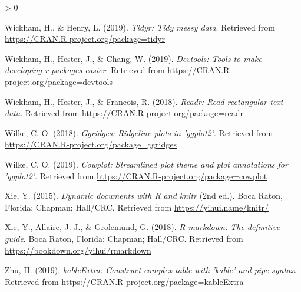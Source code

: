 \documentclass[
  english,
  doc,floatsintext]{apa6}
\newlength{\cslhangindent}
\newenvironment{CSLReferences}[2] %
 {%
  \setlength{\parindent}{0pt}
  \ifodd #1 \everypar{\setlength{\hangindent}{\cslhangindent}}\ignorespaces\fi
  \ifnum #2 > 0
  \setlength{\parskip}{#2\baselineskip}
  \fi
 }%
 {}
\begin{document}
\begin{CSLReferences}{1}{0}
\leavevmode\hypertarget{ref-R-tidyr}{}%
Wickham, H., \& Henry, L. (2019). \emph{Tidyr: Tidy messy data}. Retrieved from \url{https://CRAN.R-project.org/package=tidyr}

\leavevmode\hypertarget{ref-R-devtools}{}%
Wickham, H., Hester, J., \& Chang, W. (2019). \emph{Devtools: Tools to make developing r packages easier}. Retrieved from \url{https://CRAN.R-project.org/package=devtools}

\leavevmode\hypertarget{ref-R-readr}{}%
Wickham, H., Hester, J., \& Francois, R. (2018). \emph{Readr: Read rectangular text data}. Retrieved from \url{https://CRAN.R-project.org/package=readr}

\leavevmode\hypertarget{ref-R-ggridges}{}%
Wilke, C. O. (2018). \emph{Ggridges: Ridgeline plots in 'ggplot2'}. Retrieved from \url{https://CRAN.R-project.org/package=ggridges}

\leavevmode\hypertarget{ref-R-cowplot}{}%
Wilke, C. O. (2019). \emph{Cowplot: Streamlined plot theme and plot annotations for 'ggplot2'}. Retrieved from \url{https://CRAN.R-project.org/package=cowplot}

\leavevmode\hypertarget{ref-R-knitr}{}%
Xie, Y. (2015). \emph{Dynamic documents with {R} and knitr} (2nd ed.). Boca Raton, Florida: Chapman; Hall/CRC. Retrieved from \url{https://yihui.name/knitr/}

\leavevmode\hypertarget{ref-R-rmarkdown}{}%
Xie, Y., Allaire, J. J., \& Grolemund, G. (2018). \emph{R markdown: The definitive guide}. Boca Raton, Florida: Chapman; Hall/CRC. Retrieved from \url{https://bookdown.org/yihui/rmarkdown}

\leavevmode\hypertarget{ref-R-kableExtra}{}%
Zhu, H. (2019). \emph{kableExtra: Construct complex table with 'kable' and pipe syntax}. Retrieved from \url{https://CRAN.R-project.org/package=kableExtra}

\end{CSLReferences}

\endgroup

\newpage
\end{document}
